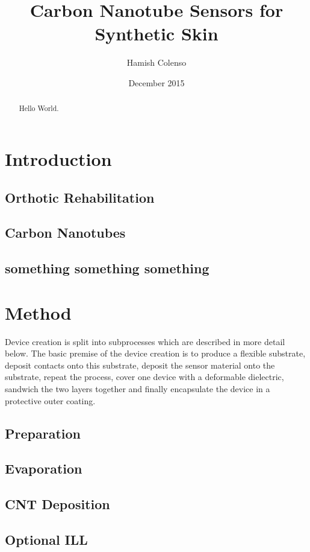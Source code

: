 \documentclass[11pt,twoside,a4paper]{article}
\begin{document}
	\title{Carbon Nanotube Sensors for Synthetic Skin}
	\author{Hamish Colenso}
	\date{December 2015}
	\maketitle
	
	\begin{abstract}
		Hello World.
	
	\end{abstract}
	
	\newpage
	\section{Introduction}
		\subsection{Orthotic Rehabilitation}
		\subsection{Carbon Nanotubes}
		\subsection{something something something}
	\newpage
	\section{Method}
		Device creation is split into subprocesses which are described in more detail below. The basic premise of the device creation is to produce a flexible substrate, deposit contacts 			onto this substrate, deposit the sensor material onto the substrate, repeat the process, cover one device with a deformable dielectric, sandwich the two layers together and 			finally encapsulate the device in a protective outer coating.
		\subsection{Preparation}
		\subsection{Evaporation}
		\subsection{CNT Deposition}
		\subsection{Optional ILL}
\end{document}
